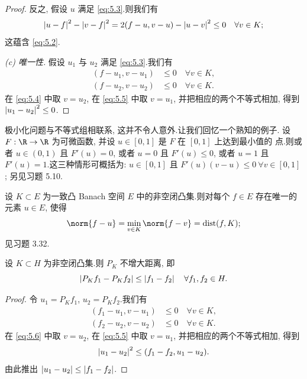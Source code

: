 \begin{proof}
反之, 假设 $u$ 满足 \eqref{eq:5.3}.则我们有
\begin{equation*}
\left|u-f\right|^2-\left|v-f\right|^2=2(f-u,v-u)-\left|u-v\right|^2\le0\quad\forall v\in K;
\end{equation*}
这蕴含 \eqref{eq:5.2}.

\emph{(c) 唯一性.} 假设 $u_1$ 与 $u_2$ 满足 \eqref{eq:5.3}.我们有
\begin{align}
(f-u_1,v-u_1)&\le0\quad\forall v\in K,\label{eq:5.4}\\
(f-u_2,v-u_2)&\le0\quad\forall v\in K.\label{eq:5.5}
\end{align}
在 \eqref{eq:5.4} 中取 $v=u_2$, 在 \eqref{eq:5.5} 中取 $v=u_1$, 并把相应的两个不等式相加, 得到
$\left|u_1-u_2\right|^2\le0$.
\end{proof}

\begin{remark}
\label{rem:5.1}
极小化问题与不等式组相联系, 这并不令人意外.让我们回忆一个熟知的例子.
设 $F:\R\to\R$ 为可微函数, 并设 $u\in[0,1]$ 是 $F$ 在 $[0,1]$ 上达到最小值的
点.则或者 $u\in(0,1)$ 且 $F'(u)=0$, 或者 $u=0$ 且 $F'(u)\le0$, 或者 $u=1$
且 $F'(u)=1$.这三种情形可概括为: $u\in[0,1]$ 且
$F'(u)(v-u)\le0\ \forall v\in[0,1]$; 另见习题 5.10.
\end{remark}

\begin{remark}
\label{rem:5.2}
设 $K\subset E$ 为一致凸 Banach 空间 $E$ 中的非空闭凸集.则对每个 $f\in E$
存在唯一的元素 $u\in E$, 使得
\begin{equation*}
\norm{f-u}=\min_{v\in K}\norm{f-v}=\dist(f,K);
\end{equation*}
见习题 3.32.
\end{remark}

\begin{proposition}
\label{prop:5.3}
设 $K\subset H$ 为非空闭凸集.则 $P_K$ 不增大距离, 即
\begin{equation*}
\left|P_Kf_1-P_Kf_2\right|\le\left|f_1-f_2\right|\quad\forall f_1,f_2\in H.
\end{equation*}
\end{proposition}

\begin{proof}
令 $u_1=P_Kf_1$, $u_2=P_Kf_2$.我们有
\begin{align}
(f_1-u_1,v-u_1)&\le0\quad\forall v\in K,\label{eq:5.6}\\
(f_2-u_2,v-u_2)&\le0\quad\forall v\in K.\label{eq:5.7}
\end{align}
在 \eqref{eq:5.6} 中取 $v=u_2$, 在 \eqref{eq:5.5} 中取 $v=u_1$, 并把相应的两个不等式相加, 得到
\begin{equation*}
\left|u_1-u_2\right|^2\le(f_1-f_2,u_1-u_2).
\end{equation*}
由此推出 $\left|u_1-u_2\right|\le\left|f_1-f_2\right|$.
\end{proof}

